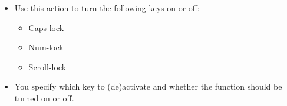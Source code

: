 % 
\begin{itemize}
\item Use this action to turn the following keys on or off:
\begin{itemize}
\item Caps-lock
\item Num-lock
\item Scroll-lock
\end{itemize}
\item You specify which key to (de)activate and whether the function should be turned on or off.
\end{itemize}
